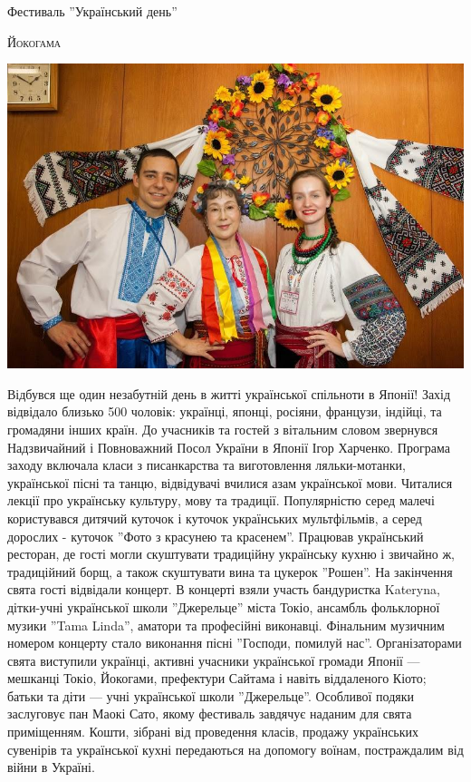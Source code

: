 \documentclass[10pt,a4paper]{article}
\newcommand{\NewsItem}[1]{%
		\usefont{T2A}{iwona}{m}{n} 
		\large #1 \vspace{4pt}
		\par \normalsize \normalfont}
\newcommand{\NewsAuthor}[1]{%
			\hfill \textsc{#1} \vspace{4pt}
			\par \normalfont}
\begin{document}
\begin{multicols}{3}

\vspace{1cm}
\NewsItem{Фестиваль ''Український день''}
\NewsAuthor{Йокогама}
		\begin{center}
			\includegraphics[width=0.8\linewidth]{images/ukr-day-fest}
		\end{center}
Відбувся ще один незабутній день в житті української спільноти в Японії!
Захід відвідало близько 500 чоловік: українці, японці, росіяни, французи, індійці, та громадяни інших країн. До учасників та гостей з вітальним словом звернувся Надзвичайний і Повноважний Посол України в Японії Ігор Харченко.
Програма заходу включала класи з писанкарства та виготовлення ляльки-мотанки, української пісні та танцю, відвідувачі вчилися азам української мови. Читалися лекції про українську культуру, мову та традиції. Популярністю серед малечі користувався дитячий куточок і куточок українських мультфільмів, а серед дорослих - куточок ''Фото з красунею та красенем''.
Працював український ресторан, де гості могли скуштувати традиційну українську кухню і звичайно ж, традиційний борщ, а також скуштувати вина та цукерок ''Рошен''. 
На закінчення свята гості відвідали концерт.
В концерті взяли участь бандуристка Kateryna, дітки-учні української школи ''Джерельце'' міста Токіо, ансамбль фольклорної музики ''Tama Linda'', аматори та професійні виконавці. Фінальним музичним номером концерту стало виконання пісні ''Господи, помилуй нас''.
Організаторами свята виступили українці, активні учасники української громади Японії — мешканці Токіо, Йокогами, префектури Сайтама і навіть віддаленого Кіото; батьки та діти — учні української школи ''Джерельце''. Особливої подяки заслуговує пан Маокі Сато, якому фестиваль завдячує наданим для свята приміщенням.
Кошти, зібрані від проведення класів, продажу українських сувенірів та української кухні передаються на допомогу воїнам, постраждалим від війни в Україні.


\end{multicols}
\end{document}
